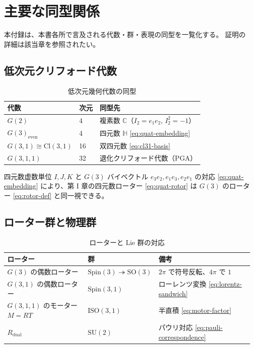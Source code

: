 \documentclass[dvipdfmx,a4paper,oneside]{jsbook}
\numberwithin{equation}{chapter}
\begin{document}
\chapter{主要な同型関係}

本付録は、本書各所で言及される代数・群・表現の同型を一覧化する。
証明の詳細は該当章を参照されたい。

\section{低次元クリフォード代数}

\begin{table}[htbp]
  \centering
  \caption{低次元幾何代数の同型}
  \label{tab:app-low-dim-iso}
  \begin{tabular}{@{}lll@{}}
    \toprule
    代数 & 次元 & 同型先 \\
    \midrule
    \(G(2)\) & 4 & 複素数 \(\mathbb{C}\)（\(I_2 = e_1e_2\), \(I_2^2=-1\)） \\
    \(G(3)_{\mathrm{even}}\) & 4 & 四元数 \(\mathbb{H}\) \eqref{eq:quat-embedding} \\
    \(G(3,1) \cong \mathrm{Cl}(3,1)\) & 16 & 双四元数 \eqref{eq:cl31-basis} \\
    \(G(3,1,1)\) & 32 & 退化クリフォード代数（PGA） \\
    \bottomrule
  \end{tabular}
\end{table}

四元数虚数単位 \(I,J,K\) と \(G(3)\) バイベクトル \(e_3e_2, e_1e_3, e_2e_1\) の対応 \eqref{eq:quat-embedding} により、第 I 章の四元数ローター \eqref{eq:quat-rotor} は \(G(3)\) のローター \eqref{eq:rotor-def} と同一視できる。

\section{ローター群と物理群}

\begin{table}[htbp]
  \centering
  \caption{ローターと Lie 群の対応}
  \label{tab:app-rotor-groups}
  \begin{tabular}{@{}lll@{}}
    \toprule
    ローター & 群 & 備考 \\
    \midrule
    \(G(3)\) の偶数ローター & \(\mathrm{Spin}(3) \twoheadrightarrow \mathrm{SO}(3)\) & \(2\pi\) で符号反転、\(4\pi\) で \(1\) \\
    \(G(3,1)\) の偶数ローター & \(\mathrm{Spin}(3,1)\) & ローレンツ変換 \eqref{eq:lorentz-sandwich} \\
    \(G(3,1,1)\) のモーター \(M=RT\) & \(\mathrm{ISO}(3,1)\) & 半直積 \eqref{eq:motor-factor} \\
    \(R_{\mathrm{dual}}\) & \(\mathrm{SU}(2)\) & パウリ対応 \eqref{eq:pauli-correspondence} \\
    \bottomrule
  \end{tabular}
\end{table}
\end{document}

